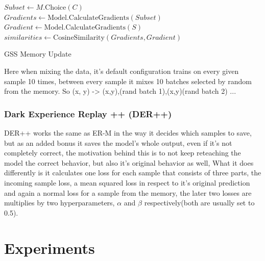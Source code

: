 \documentclass[oneside]{ctuthesis}
\begin{document}
\begin{algorithm}[H]
\SetAlgoNoEnd


$Subset \leftarrow M.\text{Choice}(C)$ \\
$Gradients \leftarrow \text{Model.CalculateGradients}(Subset)$ \\
$Gradient \leftarrow \text{Model.CalculateGradients}(S)$ \\
$similarities \leftarrow \text{CosineSimilarity}(Gradients, Gradient)$ \\


\caption{GSS Memory Update}
\label{alg:reservoir}
\end{algorithm}
Here when mixing the data, it's default configuration trains on every given sample 10 times, between every sample it mixes 10 batches selected by random from the memory. So (x, y) -> (x,y),(rand batch 1),(x,y)(rand batch 2) ...

\subsection{Dark Experience Replay ++ (DER++)} 
DER++ works the same as ER-M in the way it decides which samples to save, but as an added bonus it saves the model's whole output, even if it's not completely correct, the motivation behind this is to not keep reteaching the model the correct behavior, but also it's original behavior as well, What it does differently is it calculates one loss for each sample that consists of three parts, the incoming sample loss, a mean squared loss in respect to it's original prediction and again a normal loss for a sample from the memory, the later two losses are multiplies by two hyperparameters, $\alpha$ and $\beta$ respectively(both are usually set to 0.5).

\chapter{Experiments}
\end{document}

